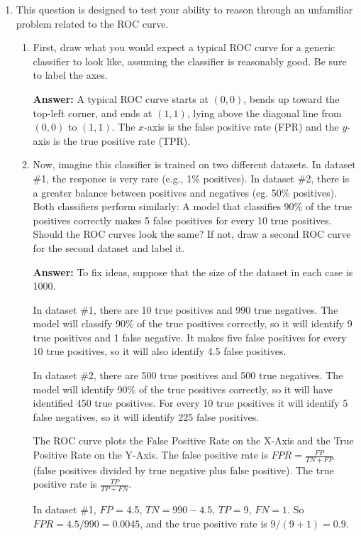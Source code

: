 \documentclass[11pt]{article}
\begin{document}
\begin{enumerate}[leftmargin=*]
\clearpage

\item This question is designed to test your ability to reason through an unfamiliar problem related to the ROC curve. 
\begin{enumerate}
  \item First, draw what you would expect a typical ROC curve for a generic classifier to look like, assuming the classifier is reasonably good. Be sure to label the axes. 

  \textbf{Answer:} A typical ROC curve starts at $(0,0)$, bends up toward the top-left corner, and ends at $(1,1)$, lying above the diagonal line from $(0,0)$ to $(1,1)$. The $x$-axis is the false positive rate (FPR) and the $y$-axis is the true positive rate (TPR).

  \item Now, imagine this classifier is trained on two different datasets. In dataset \#1, the response is very rare (e.g., 1\% positives). In dataset \#2, there is a greater balance between positives and negatives (eg. 50\% positives). Both classifiers perform similarly: A model that classifies 90\% of the true positives correctly makes 5 false positives for every 10 true positives. Should the ROC curves look the same? If not, draw a second ROC curve for the second dataset and label it. 

  \textbf{Answer:} To fix ideas, suppose that the size of the dataset in each case is 1000. 

In dataset \#1, there are 10 true positives and 990 true negatives. The model will classify 90\% of the true positives correctly, so it will identify 9 true positives and 1 false negative. It makes five false positives for every 10 true positives, so it will also identify 4.5 false positives. 

In dataset \#2, there are 500 true positives and 500 true negatives. The model will identify 90\% of the true positives correctly, so it will have identified 450 true positives. For every 10 true positives it will identify 5 false negatives, so it will identify 225 false positives. 

The ROC curve plots the False Positive Rate on the X-Axis and the True Positive Rate on the Y-Axis. The false positive rate is $FPR= \frac{FP}{ TN+ FP}$ (false positives divided by true negative plus false positive). The true positive rate is $\frac{TP}{TP+FN}$. 

In dataset \#1, $FP$ = 4.5, $TN = 990-4.5$, $TP = 9$, $FN = 1$. So $FPR =  4.5/990 = 0.0045$, and the true positive rate is $9/(9+1) = 0.9$.


\end{enumerate}
\end{enumerate}
\end{document}
